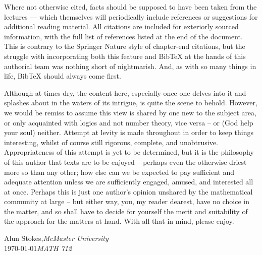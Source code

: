 Where not otherwise cited, facts should be supposed to have been taken from the lectures — which themselves will periodically include references or suggestions for additional reading material. All citations are included for exteriorly sourced information, with the full list of references listed at the end of the document. This is contrary to the Springer Nature style of chapter-end citations, but the struggle with incorporating both this feature and BibTeX at the hands of this authorial team was nothing short of nightmarish. And, as with so many things in life, BibTeX should always come first.

Although at times dry, the content here, especially once one delves into it and splashes about in the waters of its intrigue, is quite the scene to behold. However, we would be remiss to assume this view is shared by one new to the subject area, or only acquainted with logics and not number theory, vice versa -- or (God help your soul) neither. Attempt at levity is made throughout in order to keep things interesting, whilst of course still rigorous, complete, and unobtrusive. Appropriateness of this attempt is yet to be determined, but it is the philosophy of this author that texts are to be enjoyed -- perhaps even the otherwise driest more so than any other; how else can we be expected to pay sufficient and adequate attention unless we are sufficiently engaged, amused, and interested all at once. Perhaps this is just one author's opinion unshared by the mathematical community at large -- but either way, you, my reader dearest, have no choice in the matter, and so shall have to decide for yourself the merit and suitability of the approach for the matters at hand. With all that in mind, please enjoy.


\vspace{\baselineskip}
\begin{flushright}\noindent
Alun  Stokes,\hfill {\it McMaster University}\\
\monthyeardate\today \hfill {\it MATH 712}\\
\end{flushright}



